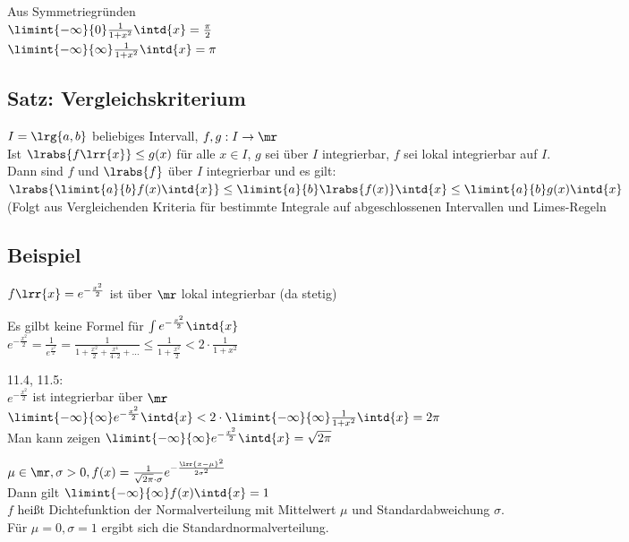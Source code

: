 	Aus Symmetriegründen\\
	$\limint{-\infty}{0}\frac{1}{1+x^2}\intd{x}=\frac{\pi}{2}$\\
	$\limint{-\infty}{\infty}\frac{1}{1+x^2}\intd{x}=\pi$
	
\subsection{Satz: Vergleichskriterium}
	$I=\lrg{a,b}$ beliebiges Intervall, $f,g: I\rightarrow\mr$\\
	Ist $\lrabs{f\lrr{x}}\leq g(x)$ für alle $x\in I$, $g$ sei über $I$ integrierbar, $f$ sei lokal integrierbar auf $I$.\\
	Dann sind $f$ und $\lrabs{f}$ über $I$ integrierbar und es gilt:\\
	$\lrabs{\limint{a}{b}f(x)\intd{x}}\leq\limint{a}{b}\lrabs{f(x)}\intd{x}\leq\limint{a}{b}g(x)\intd{x}$\\
	(Folgt aus Vergleichenden Kriteria für bestimmte Integrale auf abgeschlossenen Intervallen und Limes-Regeln
	
\subsection{Beispiel}
		\item $f\lrr{x}=e^{-\frac{x^2}{2}}$ ist über $\mr$ lokal integrierbar (da stetig)\\
			
			Es gilbt keine Formel für $\int e^{-\frac{x^2}{2}}\intd{x}$\\
			$e^{-\frac{x^2}{2}}=\frac{1}{e^{\frac{x^2}{2}}}=\frac{1}{1+\frac{x^2}{2}+\frac{x^4}{4\cdot 2}+\dots}\leq\frac{1}{1+\frac{x^2}{2}}< 2\cdot\frac{1}{1+x^2}$
			
			11.4, 11.5:\\
			$e^{-\frac{x^2}{2}}$ ist integrierbar über $\mr$\\
			$\limint{-\infty}{\infty}e^{-\frac{x^2}{2}}\intd{x}<2\cdot\limint{-\infty}{\infty}\frac{1}{1+x^2}\intd{x}=2\pi$\\
			Man kann zeigen $\limint{-\infty}{\infty}e^{-\frac{x^2}{2}}\intd{x}=\sqrt{2\pi}$
		\item $\mu\in\mr, \sigma>0, f(x)=\frac{1}{\sqrt{2\pi}\cdot\sigma}e^{-\frac{\lrr{x-\mu}^2}{2\sigma^2}}$\\
			Dann gilt $\limint{-\infty}{\infty}f(x)\intd{x}=1$\\
			$f$ heißt Dichtefunktion der Normalverteilung mit Mittelwert $\mu$ und Standardabweichung $\sigma$.\\
			Für $\mu=0, \sigma=1$ ergibt sich die Standardnormalverteilung.
	\subExEnd
